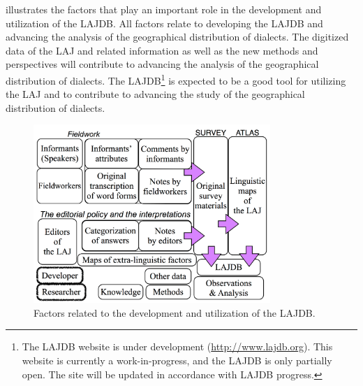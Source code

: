 \documentclass[output=paper]{LSP/langsci}
\begin{document}
\newpage
{} illustrates the factors that play an important role in the development and utilization of the LAJDB. All factors relate to developing the LAJDB and advancing the analysis of the geographical distribution of dialects. The digitized data of the LAJ and related information as well as the new methods and perspectives will contribute to advancing the analysis of the geographical distribution of dialects. The LAJDB\footnote{The LAJDB website is under development (\url{http://www.lajdb.org}). This website is currently a work-in-progress, and the LAJDB is only partially open. The site will be updated in accordance with LAJDB progress.} is expected to be a good tool for utilizing the LAJ and to contribute to advancing the study of the geographical distribution of dialects. 

\begin{figure}[t]
\includegraphics[width=0.8\textwidth]{illustrations/kuma_fig26}
\caption{Factors related to the development and utilization of the LAJDB.}
\label{fig:26}
\end{figure}  
\end{document}

